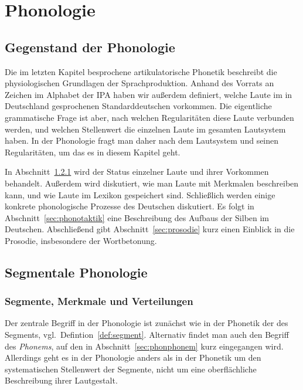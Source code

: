 \chapter{Phonologie}

\label{sec:phonologie}

\section{Gegenstand der Phonologie}

Die im letzten Kapitel besprochene artikulatorische Phonetik beschreibt die physiologischen Grundlagen der Sprachproduktion.
Anhand des Vorrats an Zeichen im Alphabet der IPA haben wir außerdem definiert, welche Laute im in Deutschland gesprochenen Standarddeutschen vorkommen.
Die eigentliche grammatische Frage ist aber, nach welchen Regularitäten diese Laute verbunden werden, und welchen Stellenwert die einzelnen Laute im gesamten Lautsystem haben.
In der Phonologie fragt man daher nach dem Lautsystem und seinen Regularitäten, um das es in diesem Kapitel geht.

In Abschnitt~\ref{sec:segmenteverteilungen} wird der Status einzelner Laute und ihrer Vorkommen behandelt.
Außerdem wird diskutiert, wie man Laute mit Merkmalen beschreiben kann, und wie Laute im Lexikon gespeichert sind.
Schließlich werden einige konkrete phonologische Prozesse des Deutschen diskutiert.
Es folgt in Abschnitt~\ref{sec:phonotaktik} eine Beschreibung des Aufbaus der Silben im Deutschen.
Abschließend gibt Abschnitt~\ref{sec:prosodie} kurz einen Einblick in die Prosodie, insbesondere der Wortbetonung.

\section{Segmentale Phonologie}

\subsection{Segmente, Merkmale und Verteilungen}

\label{sec:segmenteverteilungen}
\label{sec:verteilungen}

Der zentrale Begriff in der Phonologie ist zunächst wie in der Phonetik der des Segments, vgl.\ Defintion~\ref{def:segment}.
Alternativ findet man auch den Begriff des \textit{Phonems}, auf den in Abschnitt~\ref{sec:phonphonem} kurz eingegangen wird.
Allerdings geht es in der Phonologie anders als in der Phonetik um den systematischen Stellenwert der Segmente, nicht um eine oberflächliche Beschreibung ihrer Lautgestalt.

